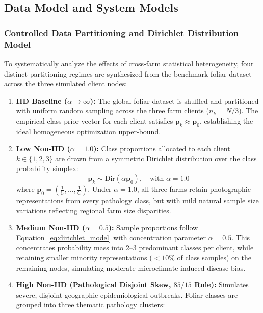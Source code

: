\documentclass[applsci,article,submit,oneauthor,pdftex]{Definitions/mdpi}
\begin{document}
\subsection{Data Model and System Models}

\subsubsection{Controlled Data Partitioning and Dirichlet Distribution Model}
To systematically analyze the effects of cross-farm statistical heterogeneity, four distinct partitioning regimes are synthesized from the benchmark foliar dataset across the three simulated client nodes:
\begin{enumerate}[leftmargin=*]
    \item \textbf{IID Baseline ($\alpha \to \infty$):} The global foliar dataset is shuffled and partitioned with uniform random sampling across the three farm clients ($n_k = N/3$). The empirical class prior vector for each client satisfies $\mathbf{p}_k \approx \mathbf{p}_0$, establishing the ideal homogeneous optimization upper-bound.
    \item \textbf{Low Non-IID ($\alpha = 1.0$):} Class proportions allocated to each client $k \in \{1, 2, 3\}$ are drawn from a symmetric Dirichlet distribution over the class probability simplex:
    \begin{equation}
    \mathbf{p}_{k} \sim \mathrm{Dir}(\alpha \mathbf{p}_0), \quad \text{with } \alpha = 1.0
    \label{eq:dirichlet_model}
    \end{equation}
    where $\mathbf{p}_0 = (\frac{1}{C}, \dots, \frac{1}{C})$. Under $\alpha = 1.0$, all three farms retain photographic representations from every pathology class, but with mild natural sample size variations reflecting regional farm size disparities.
    \item \textbf{Medium Non-IID ($\alpha = 0.5$):} Sample proportions follow Equation~\eqref{eq:dirichlet_model} with concentration parameter $\alpha = 0.5$. This concentrates probability mass into 2--3 predominant classes per client, while retaining smaller minority representations ($<10\%$ of class samples) on the remaining nodes, simulating moderate microclimate-induced disease bias.
    \item \textbf{High Non-IID (Pathological Disjoint Skew, $85/15$ Rule):} Simulates severe, disjoint geographic epidemiological outbreaks. Foliar classes are grouped into three thematic pathology clusters:
    \begin{itemize}

\end{itemize}
\end{enumerate}
\end{document}
